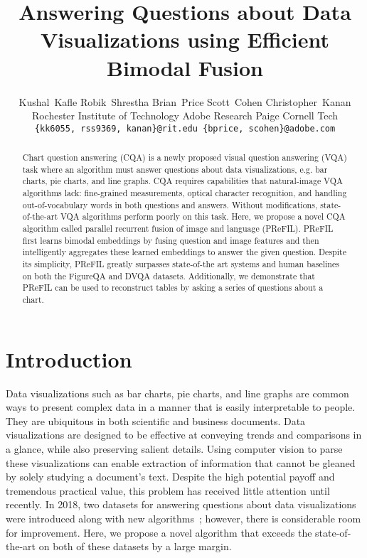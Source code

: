 \documentclass[10pt,twocolumn]{article}
\begin{document}
\title{Answering Questions about Data Visualizations using Efficient Bimodal Fusion}

\author{Kushal~Kafle \qquad Robik~Shrestha \qquad Brian~Price \qquad Scott~Cohen \qquad Christopher~Kanan\\ 
Rochester Institute of Technology \qquad Adobe Research \qquad Paige \qquad Cornell Tech\\
{\tt\small \{kk6055, rss9369, kanan\}@rit.edu \qquad  \{bprice, scohen\}@adobe.com}
}




\newcommand{\commentout}[1]{}

\maketitle

\begin{abstract}

Chart question answering (CQA) is a newly proposed visual question answering (VQA) task where an algorithm must answer questions about data visualizations, e.g. bar charts, pie charts, and line graphs. CQA requires capabilities that natural-image VQA algorithms lack: fine-grained measurements, optical character recognition, and handling out-of-vocabulary words in both questions and answers. Without modifications, state-of-the-art VQA algorithms perform poorly on this task. Here, we propose a novel CQA algorithm called parallel recurrent fusion of image and language (PReFIL). PReFIL first learns bimodal embeddings by fusing question and image features and then intelligently aggregates these learned embeddings to answer the given question. Despite its simplicity, PReFIL greatly surpasses state-of-the art systems and human baselines on both the FigureQA and DVQA datasets. Additionally, we demonstrate that PReFIL can be used to reconstruct tables by asking a series of questions about a chart.
\end{abstract}

\section{Introduction}

Data visualizations such as bar charts, pie charts, and line graphs are common ways to present complex data in a manner that is easily interpretable to people. They are ubiquitous in both scientific and business documents. Data visualizations are designed to be effective at conveying trends and comparisons in a glance, while also preserving salient details. Using computer vision to parse these visualizations can enable extraction of information that cannot be gleaned by solely studying a document's text. Despite the high potential payoff and tremendous practical value, this problem has received little attention until recently. In 2018, two datasets for answering questions about data visualizations were introduced along with new algorithms~\cite{kafle2018dvqa,figureqa}; however, there is considerable room for improvement. Here, we propose a novel algorithm that exceeds the state-of-the-art on both of these datasets by a large margin.
\end{document}

